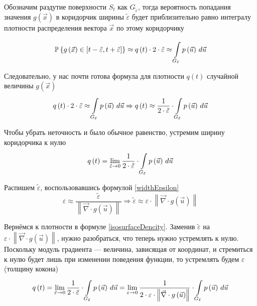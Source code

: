 Обозначим раздутие поверхности $S_t$ как $G_{\tilde{\varepsilon}}$,
тогда вероятность попадания значения $g\left( \vec{x} \right)$ в коридорчик
ширины $\tilde{\varepsilon}$ будет приблизительно равно интегралу
плотности распределения вектора $\vec{x}$ по этому коридорчику

$$\Probability{g\left( \vec{x} \right)
    \in \left[t-\tilde{\varepsilon}, t+\tilde{\varepsilon}\right]}
    \approx q\left( t \right) \cdot 2 \cdot \tilde{\varepsilon}
    \approx \integrall{G_{\tilde{\varepsilon}}}{d\vec{u}}{\pdf{\vec{u}}}$$

Следовательно, у нас почти готова формула для плотности $q\left( t \right)$
случайной величины $g\left( \vec{x} \right)$
$$q\left( t \right) \cdot 2 \cdot \tilde{\varepsilon}
        \approx \integrall{G_{\tilde{\varepsilon}}}{d\vec{u}}{\pdf{\vec{u}}}
        \Rightarrow q\left( t \right)
            \approx \frac{1}{2 \cdot \tilde{\varepsilon}}
                \cdot \integrall{G_{\tilde{\varepsilon}}}{d\vec{u}}{
                    \pdf{\vec{u}}}$$

Чтобы убрать неточность и было обычное равенство,
устремим ширину коридорчика к нулю
\begin{equation}\label{isosurfaceDencity}
    q\left( t \right)
        = \lim_{\tilde{\varepsilon} \to 0} \frac{1}{2 \cdot \tilde{\varepsilon}}
            \cdot \integrall{G_{\tilde{\varepsilon}}}{d\vec{u}}{\pdf{\vec{u}}}
\end{equation}

Распишем $\tilde{\varepsilon}$, воспользовавшись формулой \eqref{widthEpsilon}
$$\varepsilon
    \approx \frac{\tilde{\varepsilon}}
        {\left\| \vec{\nabla} \cdot {g\left( \vec{u} \right)} \right\|}
    \Rightarrow
        \tilde{\varepsilon} \approx \varepsilon
            \cdot \left\| \vec{\nabla} \cdot g\left( \vec{u} \right) \right\|$$

Вернёмся к плотности в формуле \eqref{isosurfaceDencity}.
Заменив $\tilde{\varepsilon}$ на $\varepsilon
\cdot \left\| \vec{\nabla} \cdot g\left( \vec{u} \right) \right\|$,
нужно разобраться, что теперь нужно устремлять к нулю.
Поскольку модуль градиента --- величина, зависящая от координат,
и стремиться к нулю будет лишь при изменении поведения функции,
то устремлять будем $\varepsilon$ (толщину кокона)
$$q\left( t \right)
        = \lim_{\tilde{\varepsilon} \to 0} \frac{1}{2 \cdot \tilde{\varepsilon}}
            \cdot \integrall{G_{\tilde{\varepsilon}}}{d\vec{u}}{\pdf{\vec{u}}}
        = \lim_{\varepsilon \to 0} \frac{1}{2 \cdot \varepsilon
            \cdot \left\| \vec{\nabla} \cdot g\left( \vec{u} \right) \right\|}
            \cdot \integrall{G_{\tilde{\varepsilon}}}{d\vec{u}}{\pdf{\vec{u}}}$$

